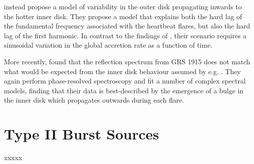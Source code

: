 \par \citealp{Mir_LagModel} instead propose a model of variability in the outer disk propagating inwards to the hotter inner disk.  They propose a model that explains both the hard lag of the fundamental frequency associated with the heartbeat flares, but also the hard lag of the first harmonic.  In contrast to the findings of \citealp{Massaro_DiffEq}, their scenario requires a sinusoidal variation in the global accretion rate as a function of time.
\par More recently, \citealp{Zoghbi_Bulge} found that the reflection spectrum from GRS 1915 does not match what would be expected from the inner disk behaviour assumed by e.g. \citealp{Nayakshin_GRSModel}.  They again perform phase-resolved spectroscopy and fit a number of complex spectral models, finding that their data is best-described by the emergence of a bulge in the inner disk which propagates outwards during each flare.

\section{Type II Burst Sources}

xxxxx